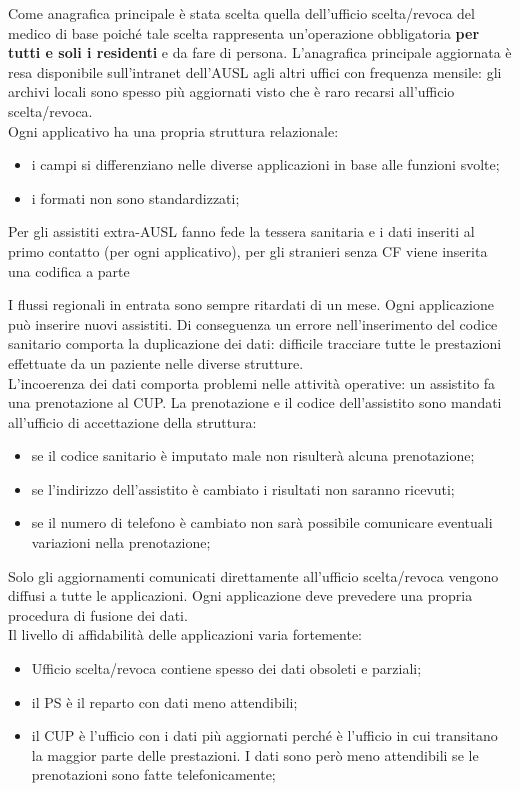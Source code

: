 \documentclass{article}
\begin{document}
Come anagrafica principale è stata scelta quella dell'ufficio scelta/revoca del medico di base poiché tale scelta rappresenta un'operazione obbligatoria \textbf{per tutti e soli i residenti} e da fare di persona.
L'anagrafica principale aggiornata è resa disponibile sull'intranet dell'AUSL agli altri uffici con frequenza mensile: gli archivi locali sono spesso più aggiornati visto che è raro recarsi all'ufficio scelta/revoca.
\\
Ogni applicativo ha una propria struttura relazionale:
\begin{itemize}
    \item i campi si differenziano nelle diverse applicazioni in base alle funzioni svolte;
    \item i formati non sono standardizzati;
\end{itemize}
\begin{note}
    Per gli assistiti extra-AUSL fanno fede la tessera sanitaria e i dati inseriti al primo contatto (per ogni applicativo), per gli stranieri senza CF viene inserita una codifica a parte
\end{note}
I flussi regionali in entrata sono sempre ritardati di un mese.
\emptyln{}
Ogni applicazione può inserire nuovi assistiti.
Di conseguenza un errore nell'inserimento del codice sanitario comporta la duplicazione dei dati: difficile tracciare tutte le prestazioni effettuate da un paziente nelle diverse strutture.
\\
L'incoerenza dei dati comporta problemi nelle attività operative: un assistito fa una prenotazione al CUP.
La prenotazione e il codice dell'assistito sono mandati all'ufficio di accettazione della struttura:
\begin{itemize}
    \item se il codice sanitario è imputato male non risulterà alcuna prenotazione;
    \item se l'indirizzo dell'assistito è cambiato i risultati non saranno ricevuti;
    \item se il numero di telefono è cambiato non sarà possibile comunicare eventuali variazioni nella prenotazione;
\end{itemize}
Solo gli aggiornamenti comunicati direttamente all'ufficio scelta/revoca vengono diffusi a tutte le applicazioni.
Ogni applicazione deve prevedere una propria procedura di fusione dei dati.
\\
Il livello di affidabilità delle applicazioni varia fortemente:
\begin{itemize}
    \item Ufficio scelta/revoca contiene spesso dei dati obsoleti e parziali;
    \item il PS è il reparto con dati meno attendibili;
    \item il CUP è l'ufficio con i dati più aggiornati perché è l'ufficio in cui transitano la maggior parte delle prestazioni.
        I dati sono però meno attendibili se le prenotazioni sono fatte telefonicamente;
\end{itemize}
%
\end{document}
